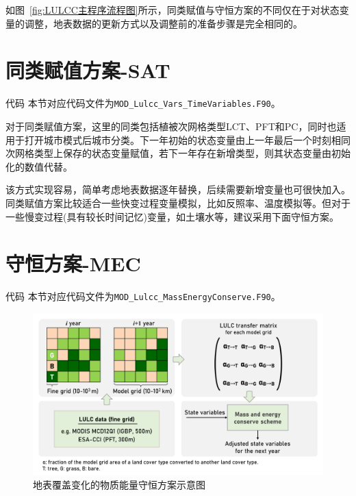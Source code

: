 如图~\ref{fig:LULCC主程序流程图}所示，同类赋值与守恒方案的不同仅在于对状态变量的调整，地表数据的更新方式以及调整前的准备步骤是完全相同的。

\section{同类赋值方案-SAT}
\begin{mymdframed}{代码}
  本节对应代码文件为\texttt{MOD\_Lulcc\_Vars\_TimeVariables.F90}。
\end{mymdframed}

对于同类赋值方案，这里的同类包括植被次网格类型LCT、PFT和PC，同时也适用于打开城市模式后城市分类。下一年初始的状态变量由上一年最后一个时刻相同次网格类型上保存的状态变量赋值，若下一年存在新增类型，则其状态变量由初始化的数值代替。

该方式实现容易，简单考虑地表数据逐年替换，后续需要新增变量也可很快加入。同类赋值方案比较适合一些快变过程变量模拟，比如反照率、温度模拟等。但对于一些慢变过程(具有较长时间记忆)变量，如土壤水等，建议采用下面守恒方案。

\section{守恒方案-MEC}
\begin{mymdframed}{代码}
  本节对应代码文件为\texttt{MOD\_Lulcc\_MassEnergyConserve.F90}。
\end{mymdframed}

{
  \begin{figure}[htbp]
    \centering
    \includegraphics[width=\textwidth]{Figures/土地利用与土地覆盖变化模拟/LULCC流程图_v2.png}
    \caption{地表覆盖变化的物质能量守恒方案示意图}
    \label{fig:LULCC流程图}
  \end{figure}
}

